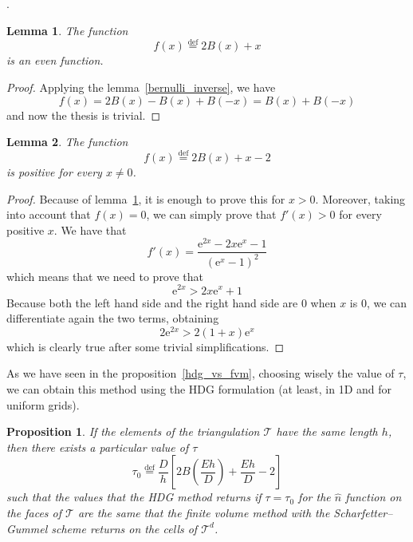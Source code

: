 \documentclass[a4paper,11pt, draft]{article}
\newtheorem{prop}{Proposition}
\newtheorem{lemma}{Lemma}[prop]
\newcommand{\Def}{\stackrel{\mathrm{def}}{=}}
\newcommand{\dualt}{\ensuremath{\mathcal{T}^d}}
\begin{document}
.
\begin{lemma}\label{bernulli_even}
 The function
 \[ f(x) \Def 2 B(x) + x \]
 is an even function.
\end{lemma}

\begin{proof}
Applying the lemma~\ref{bernulli_inverse}, we have
\[ f(x) = 2B(x) - B(x) + B(-x) = B(x) + B(-x)\]
and now the thesis is trivial.
\end{proof}

\begin{lemma}\label{tau_positive}
 The function
 \[ f(x) \Def 2B(x) + x - 2 \]
 is positive for every $x \neq 0$.
\end{lemma}

\begin{proof}
 Because of lemma~\ref{bernulli_even}, it is enough to prove this for $x > 0$. Moreover, taking
into account that $f(x) = 0$, we can simply prove that $f'(x) > 0$ for every positive $x$. We have
that
\[
  f'(x) = \frac{\mathrm{e}^{2  x} - 2 x \mathrm{e}^{x} - 1}{(\mathrm{e}^{x} - 1)^2}
\]
which means that we need to prove that
\[ \mathrm{e}^{2x} > 2x \mathrm{e}^x + 1\]
Because both the left hand side and the right hand side are 0 when $x$ is 0, we can differentiate
again the two terms, obtaining
\[ 2\mathrm{e}^{2x} > 2(1 + x)\mathrm{e}^x \]
which is clearly true after some trivial simplifications.
\end{proof}



As we have seen in the proposition~\ref{hdg_vs_fvm}, choosing wisely the value of $\tau$, we can 
obtain this method using the HDG formulation (at least, in 1D and for uniform grids). 
\begin{prop}\label{hdg_vs_sg}
If the elements of the triangulation $\mathcal{T}$ have the same length $h$, then there exists 
a particular value of $\tau$
\[ \tau_0 \Def \frac{D}{h}\left[2B\left(\!\frac{Eh}{D}\!\right) + \frac{Eh}{D} - 2 \right] \]
such that the values that the HDG method returns if $\tau = \tau_0$ for the 
$\widehat{n}$ function on the faces of $\mathcal{T}$ are the same that the finite volume method 
 with the Scharfetter--Gummel scheme returns on the cells of \dualt.

\end{prop}
\end{document}
